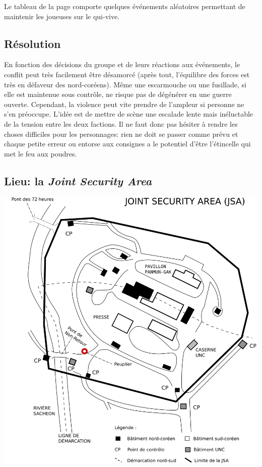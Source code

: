 Le tableau de la page \pageref{table:peuplier} comporte quelques événements aléatoires permettant de maintenir les joueuses sur le qui-vive.

\subsection{Résolution}

En fonction des décisions du groupe et de leurs réactions aux événements, le conflit peut très facilement être désamorcé (après tout, l'équilibre des forces est très en défaveur des nord-coréens).
Même une escarmouche ou une fusillade, si elle est maintenue sous contrôle, ne risque pas de dégénérer en une guerre ouverte.
Cependant, la violence peut vite prendre de l'ampleur si personne ne s'en préoccupe.
L'idée est de mettre de scène une escalade lente mais inéluctable de la tension entre les deux factions.
Il ne faut donc pas hésiter à rendre les choses difficiles pour les personnages: rien ne doit se passer comme prévu et chaque petite erreur ou entorse aux consignes a le potentiel d'être l'étincelle qui met le feu aux poudres.

\subsection*{Lieu: la \emph{Joint Security Area}}

\includegraphics[width=\textwidth]{images/jsa.png}

